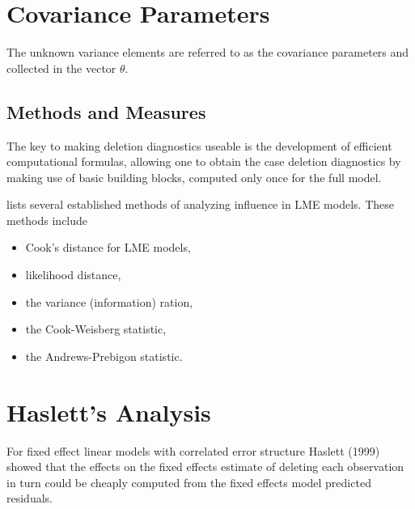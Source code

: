 \documentclass[12pt, a4paper]{report}
\theoremstyle{plain}
\theoremstyle{definition}
\theoremstyle{remark}
\begin{document}
	
	
	
	
	\section{Covariance Parameters} %
	The unknown variance elements are referred to as the covariance parameters and collected in the vector $\theta$.
	
	\subsection{Methods and Measures}
	The key to making deletion diagnostics useable is the development of efficient computational formulas, allowing one to obtain the  case deletion diagnostics by making use of basic building blocks, computed only once for the full model.
	
	\citet{Zewotir} lists several established methods of analyzing influence in LME models. These methods include \begin{itemize}
		\item Cook's distance for LME models,
		\item {} likelihood distance,
		\item the variance (information) ration,
		\item the  Cook-Weisberg statistic,
		\item the  Andrews-Prebigon statistic.
	\end{itemize}
	
	
	\section{Haslett's Analysis} %
	For fixed effect linear models with correlated error structure Haslett (1999) showed that the effects on
	the fixed effects estimate of deleting each observation in turn could be cheaply computed from the fixed effects model predicted residuals.
	
	
	
\end{document}
